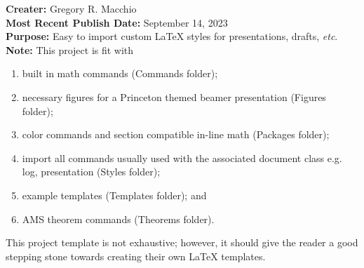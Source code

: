 \documentclass{article}
\begin{document}
    \noindent \textbf{Creater:} Gregory R. Macchio \\
    \textbf{Most Recent Publish Date:} September 14, 2023 \\
    \noindent \textbf{Purpose:} Easy to import custom LaTeX styles for presentations, drafts, \textit{etc}. \\
    \noindent \textbf{Note:}
    This project is fit with 
    \begin{enumerate}
        \item built in math commands (Commands folder);
        \item necessary figures for a Princeton themed beamer presentation (Figures folder);
        \item color commands and section compatible in-line math (Packages folder);
        \item import all commands usually used with the associated document class e.g. log, presentation (Styles folder);
        \item example templates (Templates folder); and
        \item AMS theorem commands (Theorems folder).
    \end{enumerate}
    \noindent This project template is not exhaustive; however, it should give the reader a good stepping stone towards creating their own LaTeX templates.
\end{document}
